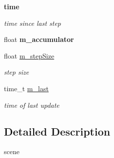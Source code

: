 \begin{Indent}{\bf time}\par
{\em \label{_amgrp07cc694b9b3fc636710fa08b6922c42b}
 time since last step }\begin{DoxyCompactItemize}
\item 
\hypertarget{classContent_1_1Scene_a77b8d3b84e2e8b21134ceb9be3dc0df7}{
float {\bfseries m\_\-accumulator}}
\label{classContent_1_1Scene_a77b8d3b84e2e8b21134ceb9be3dc0df7}

\item 
\hypertarget{classContent_1_1Scene_a868a0e8dd3427165876b047b4fc098ac}{
float \hyperlink{classContent_1_1Scene_a868a0e8dd3427165876b047b4fc098ac}{m\_\-stepSize}}
\label{classContent_1_1Scene_a868a0e8dd3427165876b047b4fc098ac}

\begin{DoxyCompactList}\small\item\em step size \item\end{DoxyCompactList}\item 
\hypertarget{classContent_1_1Scene_a1737b1a39bb7a6fa0155d9fb7a63c163}{
time\_\-t \hyperlink{classContent_1_1Scene_a1737b1a39bb7a6fa0155d9fb7a63c163}{m\_\-last}}
\label{classContent_1_1Scene_a1737b1a39bb7a6fa0155d9fb7a63c163}

\begin{DoxyCompactList}\small\item\em time of last update \item\end{DoxyCompactList}\end{DoxyCompactItemize}
\end{Indent}


\subsection{Detailed Description}
scene 

